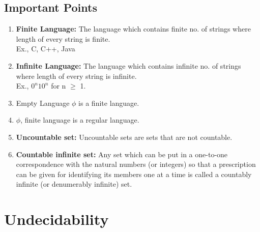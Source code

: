 \documentclass[a4paper,oneside]{book}
\begin{document}
\section{Important Points}
\begin{enumerate}
\item \textbf{Finite Language:} The language which contains finite no. of strings where length of every string is finite.\\Ex., C, C++, Java
\item \textbf{Infinite Language:} The language which contains infinite no. of strings where length of every string is infinite.\\Ex., $0^n10^n$ for n $\ge$ 1.
\item Empty Language $\phi$ is a finite language.
\item $\phi$, finite language is a regular language.
\item \textbf{Uncountable set:} Uncountable sets are sets that are not countable.
\item \textbf{Countable infinite set:} Any set which can be put in a one-to-one correspondence with the natural numbers (or integers) so that a prescription can be given for identifying its members one at a time is called a countably infinite (or denumerably infinite) set.
\end{enumerate}
\chapter{Undecidability}
\end{document}
